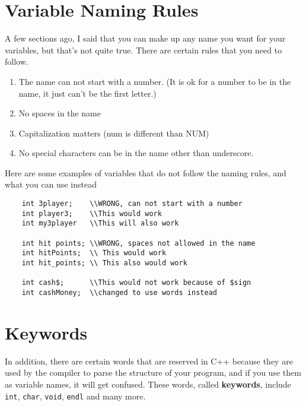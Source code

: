 \section{Variable Naming Rules}
A few sections ago, I said that you can make up any name you
want for your variables, but that's not quite true. There are certain rules that you need to follow.
\begin{enumerate}
    \item The name can not start with a number. (It is ok for a number to be in the name, it just can't be the first letter.)
    \item No spaces in the name
    \item Capitalization matters (num is different than NUM) 
    \item No special characters can be in the name other than underscore.
\end{enumerate}

Here are some examples of variables that do not follow the naming rules, and what you can use instead
\begin{mdframed}
\begin{verbatim}
    int 3player;    \\WRONG, can not start with a number
    int player3;    \\This would work
    int my3player   \\This will also work
    
    int hit points; \\WRONG, spaces not allowed in the name
    int hitPoints;  \\ This would work
    int hit_points; \\ This also would work
    
    int cash$;      \\This would not work because of $sign
    int cashMoney;  \\changed to use words instead
\end{verbatim}
\end{mdframed}
\section{Keywords}
In addition, there
are certain words that are reserved in C++ because they are
used by the compiler to parse the structure of your program,
and if you use them as variable names, it will get confused.
These words, called {\bf keywords}, include {\tt int},
{\tt char}, {\tt void}, {\tt endl} and many more.

